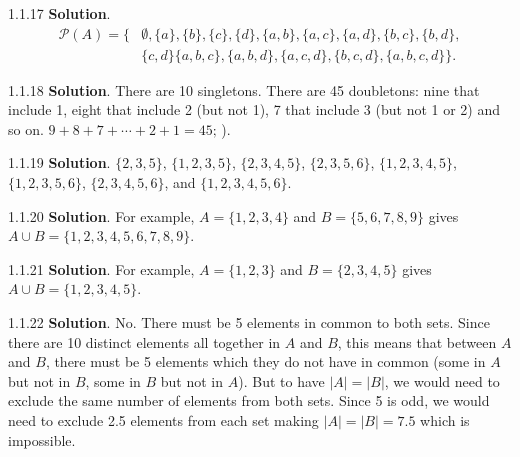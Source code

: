 \documentclass[11pt,]{book}
\theoremstyle{ptxplainnotitle}
\theoremstyle{ptxplaintitle}
\theoremstyle{ptxdefinitionnotitle}
\theoremstyle{ptxdefinitiontitle}
\theoremstyle{ptxdefinitionnotitle}
\theoremstyle{ptxdefinitiontitle}
\theoremstyle{ptxdefinitionnotitle}
\theoremstyle{ptxdefinitiontitle}
\theoremstyle{ptxdefinitiontitlenonumber}
\theoremstyle{ptxdefinitiontitlenonumber}
\numberwithin{equation}{chapter}
\newcommand{\pow}{\mathcal P}
\newcommand{\amp}{&}
\begin{document}
\begin{divisionexercise}{1.1.17}
\textbf{Solution}.\quad%
\hypertarget{p-964}{}%
%
\begin{align*}
\pow(A) = \{\amp \emptyset, \{a\}, \{b\}, \{c\}, \{d\}, \{a,b\}, \{a,c\}, \{a,d\}, \{b,c\}, \{b,d\},\\
\amp \{c,d\} \{a,b,c\}, \{a,b,d\}, \{a,c,d\}, \{b,c,d\}, \{a,b,c,d\}\}\text{.}
\end{align*}
%
\end{divisionexercise}%
\begin{divisionexercise}{1.1.18}
\textbf{Solution}.\quad%
\hypertarget{p-974}{}%
There are 10 singletons. There are 45 doubletons: nine that include 1, eight that include 2 (but not 1), 7 that include 3 (but not 1 or 2) and so on. \(9+8+7+\cdots+2+1 = 45\text{;}\) ).%
\end{divisionexercise}%
\begin{divisionexercise}{1.1.19}
\textbf{Solution}.\quad%
\hypertarget{p-976}{}%
\(\{2,3,5\}\), \(\{1,2,3,5\}\), \(\{2,3,4,5\}\), \(\{2,3,5,6\}\), \(\{1,2,3,4,5\}\), \(\{1,2,3,5,6\}\), \(\{2,3,4,5,6\}\), and \(\{1,2,3,4,5,6\}\).%
\end{divisionexercise}%
\begin{divisionexercise}{1.1.20}
\textbf{Solution}.\quad%
\hypertarget{p-978}{}%
For example, \(A = \{1,2,3,4\}\) and \(B = \{5,6,7,8,9\}\) gives \(A \cup B = \{1,2,3,4,5,6,7,8,9\}\).%
\end{divisionexercise}%
\begin{divisionexercise}{1.1.21}
\textbf{Solution}.\quad%
\hypertarget{p-980}{}%
For example, \(A = \{1,2,3\}\) and \(B = \{2,3,4,5\}\) gives \(A\cup B = \{1,2,3,4,5\}\).%
\end{divisionexercise}%
\begin{divisionexercise}{1.1.22}
\textbf{Solution}.\quad%
\hypertarget{p-982}{}%
No. There must be 5 elements in common to both sets. Since there are 10 distinct elements all together in \(A\) and \(B\), this means that between \(A\) and \(B\), there must be 5 elements which they do not have in common (some in \(A\) but not in \(B\), some in \(B\) but not in \(A\)). But to have \(|A| = |B|\), we would need to exclude the same number of elements from both sets.  Since 5 is odd, we would need to exclude 2.5 elements from each set making \(|A| = |B| = 7.5\) which is impossible.%
\end{divisionexercise}%
\end{document}
